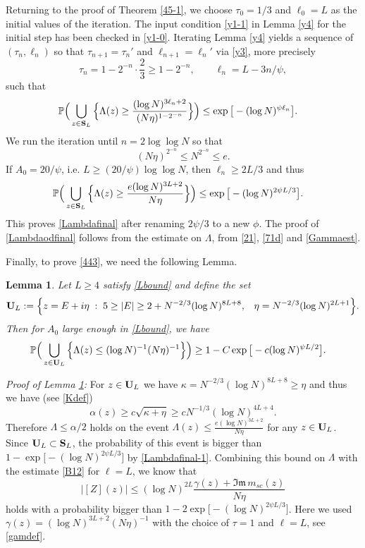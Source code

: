 \documentclass[draft]{article}
\newcommand{\al}{\alpha}
\newcommand{\be}{\begin{equation}}
\newcommand{\ee}{\end{equation}}
\newcommand{\im}{{\mathfrak{Im} \, }}
\renewcommand{\P}{{\mathbb P}}
\newcommand{\bU}{ {\bf  U}}
\newcommand{\bS}{ {\bf  S}}
\newtheorem{lemma}[theorem]{Lemma}
\numberwithin{equation}{section}
\numberwithin{theorem}{section}
\numberwithin{definition}{section}
\numberwithin{remark}{section}
\begin{document}
\bigskip

Returning to the proof of Theorem  \ref{45-1},  we choose  
 $\tau_0= 1/3$ and $\ell_0=L$ as the initial values of the iteration.
The input condition \eqref{y1-1} in Lemma \ref{y4}
for the initial step has been checked in \eqref{y1-0}.
Iterating  Lemma \ref{y4} yields a sequence of $(\tau_n, \ell_n)$
so that $\tau_{n+1}=\tau_n'$ and $\ell_{n+1}=\ell_n'$ via \eqref{y3}, more precisely
$$
   \tau_n = 1- 2^{-n}\cdot\frac{2}{3} \ge 1-2^{-n}, \qquad \ell_n = L - 3n/\psi,
$$
such that
\be\label{Lambdafinal-3} 
\P \Big ( \bigcup_{z\in \bS_L} \Big\{ \Lambda(z) 
 \ge \frac{(\log N)^{ 3\ell_n+2 } }{ (N\eta)^{1 -2^{-n} } } \Big\}   \Big )
\le  \exp{\big[-(\log N)^{ \psi\ell_n } \big]}.  \quad 
\ee
We run the iteration until $n =2\log\log N$ so  that
$$
   (N\eta)^{2^{-n}} \le N^{2^{-n}} \le e.
$$
If $A_0=20/\psi$, i.e. $L\ge (20/\psi)\log\log N$,  then 
$\ell_n \ge 2L/3$ and thus
\be\label{Lambdafinal-1} 
\P \Big ( \bigcup_{z\in \bS_L} \Big\{ \Lambda(z) 
 \ge \frac{e(\log N)^{ 3L+2 } }{ N\eta } \Big\}   \Big )
\le  \exp{\big[-(\log N)^{ 2\psi L/3 } \big]}.  \quad 
\ee
This proves
\eqref{Lambdafinal} after renaming  $2 \psi/3$ to a new $\phi$. 
The proof of \eqref{Lambdaodfinal} follows from the estimate
on $\Lambda$,  from \eqref{21}, \eqref{71d} and 
\eqref{Gammaest}.



\medskip

Finally, to prove \eqref{443}, we need the following Lemma. 

\begin{lemma}\label{etaf} Let  $L\ge4$ satisfy \eqref{Lbound} 
and define the set
\be\label{etafix}
\bU_L:= \Big \{z=E+i\eta \; : \;
 5\geq |E|\geq 2+N^{-2/3}(\log N)^{8L+8},\,\,\,\,\,\eta=N^{-2/3}(\log N)^{2L+1}  \Big \}.
\ee
Then for $A_0$ large enough in \eqref{Lbound}, we have
\be\label{434}
\P \Big (\bigcup_{z\in \bU_L}
 \Big\{ 
  \Lambda(z)\leq (\log N)^{-1}(N\eta)^{-1}   
  \Big\}\Big)
  \ge 1-   C\exp{\big[-c(\log N)^{\psi L/2  } \big]}.  \quad 
\ee
\end{lemma}
\bigskip

{\it Proof of Lemma \ref{etaf}: } 
For $z\in \bU_L$ we have $\kappa = N^{-2/3}(\log N)^{8L+8} \ge \eta$ and thus 
 we have  (see \eqref{Kdef})
$$
  \al(z)\ge  c\sqrt{\kappa+\eta} \ge c N^{-1/3}(\log N)^{4L+4}.
$$
Therefore
$\Lambda \le \alpha /2 $ holds on the event $
\Lambda (z) \le \frac {e(\log N)^{3 L+2}} { N \eta} $ for any $z\in \bU_L$.
 Since $\bU_L\subset\bS_L$,
the  probability of this event is
 bigger than $1- \exp{\big[-(\log N)^{2\psi L/3} \big]}$
by \eqref{Lambdafinal-1}. Combining this bound on $\Lambda$
with the estimate \eqref{B12} for $\ell=L$, we know that
$$
   |[Z](z)|\le  (\log N)^{2L} \frac{ \gamma(z) + \im m_{sc}(z)}{N\eta}
$$
holds with a probability bigger than $1- 2\exp{\big[-(\log N)^{2\psi L/3} \big]}$.
Here we used $\gamma(z)= (\log N)^{3L+2}(N\eta)^{-1}$
with the choice of $\tau =1$ and $\ell =L$, see \eqref{gamdef}.
\end{document}
